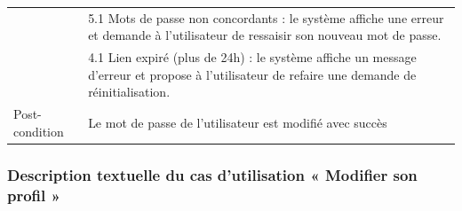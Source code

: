 \documentclass[12pt,a4paper]{report}
\begin{document}
\begin{table}[H]
\begin{tabular}{|p{3.5cm}|p{10.5cm}|}
 & 5.1 Mots de passe non concordants : le système affiche une erreur et demande à l'utilisateur de ressaisir son nouveau mot de passe. \\

 & 4.1 Lien expiré (plus de 24h) : le système affiche un message d'erreur et propose à l'utilisateur de refaire une demande de réinitialisation. \\

 \hline

 Post-condition & Le mot de passe de l'utilisateur est modifié avec succès \\

 \hline

 \end{tabular}

\end{table}



\subsubsection{Description textuelle du cas d'utilisation « Modifier son profil »}
\end{document}
